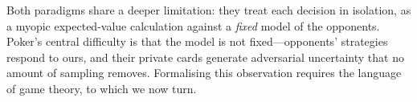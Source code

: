 Both paradigms share a deeper limitation: they treat each decision in isolation, as a myopic expected-value calculation against a \emph{fixed} model of the opponents. Poker's central difficulty is that the model is not fixed---opponents' strategies respond to ours, and their private cards generate adversarial uncertainty that no amount of sampling removes. Formalising this observation requires the language of game theory, to which we now turn.
